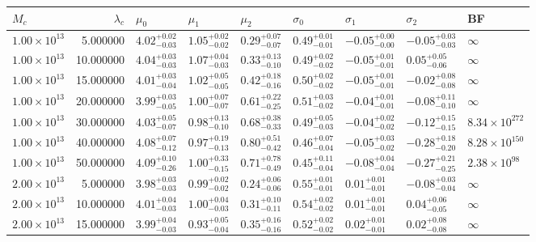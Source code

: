 \begin{tabular}{lrlllllll}
\toprule
$M_c$ & $\lambda_c$ & $\mu_0$ & $\mu_1$ & $\mu_2$ & $\sigma_0$ & $\sigma_1$ & $\sigma_2$ & BF \\
\midrule
$1.00 \times 10^{13}$ & 5.000000 & $4.02^{+0.02}_{-0.03}$ & $1.05^{+0.02}_{-0.02}$ & $0.29^{+0.07}_{-0.07}$ & $0.49^{+0.01}_{-0.01}$ & $-0.05^{+0.00}_{-0.00}$ & $-0.05^{+0.03}_{-0.03}$ & $\infty$ \\
$1.00 \times 10^{13}$ & 10.000000 & $4.04^{+0.03}_{-0.03}$ & $1.07^{+0.04}_{-0.03}$ & $0.33^{+0.13}_{-0.10}$ & $0.49^{+0.02}_{-0.02}$ & $-0.05^{+0.01}_{-0.01}$ & $0.05^{+0.05}_{-0.06}$ & $\infty$ \\
$1.00 \times 10^{13}$ & 15.000000 & $4.01^{+0.03}_{-0.04}$ & $1.02^{+0.05}_{-0.05}$ & $0.42^{+0.18}_{-0.16}$ & $0.50^{+0.02}_{-0.02}$ & $-0.05^{+0.01}_{-0.01}$ & $-0.02^{+0.08}_{-0.08}$ & $\infty$ \\
$1.00 \times 10^{13}$ & 20.000000 & $3.99^{+0.03}_{-0.05}$ & $1.00^{+0.07}_{-0.07}$ & $0.61^{+0.22}_{-0.25}$ & $0.51^{+0.03}_{-0.02}$ & $-0.04^{+0.01}_{-0.01}$ & $-0.08^{+0.11}_{-0.10}$ & $\infty$ \\
$1.00 \times 10^{13}$ & 30.000000 & $4.03^{+0.05}_{-0.07}$ & $0.98^{+0.13}_{-0.10}$ & $0.68^{+0.38}_{-0.33}$ & $0.49^{+0.05}_{-0.03}$ & $-0.04^{+0.02}_{-0.02}$ & $-0.12^{+0.15}_{-0.15}$ & $8.34 \times 10^{272}$ \\
$1.00 \times 10^{13}$ & 40.000000 & $4.08^{+0.07}_{-0.12}$ & $0.97^{+0.19}_{-0.13}$ & $0.80^{+0.51}_{-0.42}$ & $0.46^{+0.07}_{-0.04}$ & $-0.05^{+0.03}_{-0.02}$ & $-0.28^{+0.18}_{-0.20}$ & $8.28 \times 10^{150}$ \\
$1.00 \times 10^{13}$ & 50.000000 & $4.09^{+0.10}_{-0.26}$ & $1.00^{+0.33}_{-0.15}$ & $0.71^{+0.78}_{-0.49}$ & $0.45^{+0.11}_{-0.04}$ & $-0.08^{+0.04}_{-0.04}$ & $-0.27^{+0.21}_{-0.25}$ & $2.38 \times 10^{98}$ \\
$2.00 \times 10^{13}$ & 5.000000 & $3.98^{+0.03}_{-0.03}$ & $0.99^{+0.02}_{-0.02}$ & $0.24^{+0.06}_{-0.06}$ & $0.55^{+0.01}_{-0.01}$ & $0.01^{+0.01}_{-0.01}$ & $-0.08^{+0.03}_{-0.04}$ & $\infty$ \\
$2.00 \times 10^{13}$ & 10.000000 & $4.01^{+0.04}_{-0.03}$ & $1.00^{+0.04}_{-0.03}$ & $0.31^{+0.10}_{-0.11}$ & $0.54^{+0.02}_{-0.02}$ & $0.01^{+0.01}_{-0.01}$ & $0.04^{+0.06}_{-0.05}$ & $\infty$ \\
$2.00 \times 10^{13}$ & 15.000000 & $3.99^{+0.04}_{-0.03}$ & $0.93^{+0.05}_{-0.04}$ & $0.35^{+0.16}_{-0.16}$ & $0.52^{+0.02}_{-0.02}$ & $0.02^{+0.01}_{-0.01}$ & $0.02^{+0.08}_{-0.08}$ & $\infty$ \\

\end{tabular}
